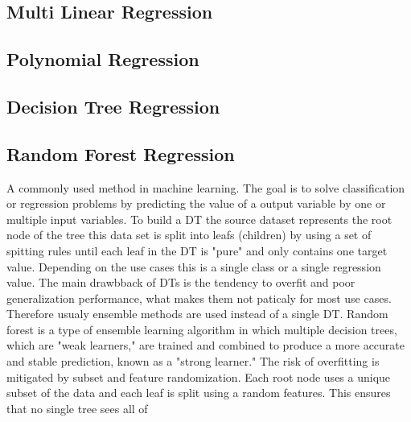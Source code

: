 \subsection{Multi Linear Regression}\label{subsec:multi-linear-regression}

\subsection{Polynomial Regression}\label{subsec:polynomial-regression}

\subsection{Decision Tree Regression}\label{subsec:decision-tree-regression}

\subsection{Random Forest Regression}\label{subsec:random-forest-regression}
A commonly used method in machine learning. The goal is to solve classification or regression
problems by predicting
the value of a output variable by one or multiple input variables. \cite[p.
253]{shaik_briefsurveyrandom_2019}
To build a \ac{DT} the source dataset represents the root node of the tree this data set is split
into leafs
(children) by using a set of spitting rules until each leaf in the \ac{DT} is "pure" and only
contains one target
value. Depending on the use cases this is a single class or a single regression value. \cite[p.
70-72]{muller_introductionmachinelearning_2016}
The main drawbback of \ac{DT}s is the tendency to overfit and poor generalization performance,
what makes them not
paticaly for most use cases. Therefore usualy ensemble methods are used instead of a single
\ac{DT}. \cite[p.
78]{muller_introductionmachinelearning_2016} \cite[p. 251]{liu_newmachinelearning_2012}
Random forest \cite[]{breiman_randomforests_2001} is a type of ensemble learning algorithm in
which multiple decision
trees, which are "weak learners," are trained and combined to produce a more accurate and stable
prediction, known as
a "strong learner." \cite[p. 24]{awad_efficientlearningmachines_2015}
The risk of overfitting is mitigated by subset and feature randomization. Each root node uses a
unique subset of the
data and each leaf is split using a random features. This ensures that no single tree sees all of
